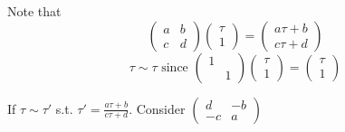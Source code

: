 \documentclass[twoside]{amsart}
\begin{document}
Note that 
\[
\left( \begin{matrix} a & b \\ c & d \end{matrix} \right) \left( \begin{matrix} \tau \\ 1 \end{matrix} \right) = \left( \begin{matrix} a\tau + b \\ c \tau + d \end{matrix} \right) 
\]
\[
\tau \sim \tau \text{ since } \left( \begin{matrix} 1 & \\ & 1 \end{matrix} \right) \left( \begin{matrix} \tau \\ 1 \end{matrix} \right) = \left( \begin{matrix} \tau \\ 1 \end{matrix} \right) 
\]

If $\tau \sim \tau'$ s.t. $\tau' = \frac{ a\tau + b}{ c\tau +d }$.  Consider $\left( \begin{matrix} d & - b \\ -c & a \end{matrix} \right)$   \\
\end{document}
